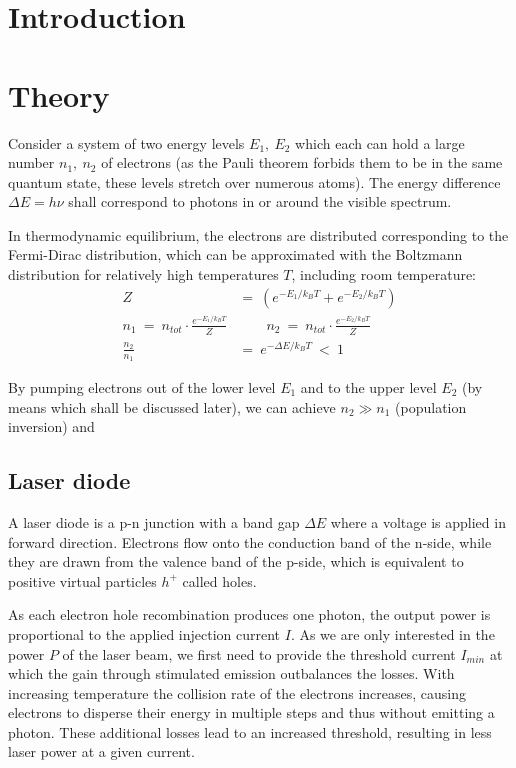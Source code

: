 
\section{Introduction}

\section{Theory}
Consider a system of two energy levels $E_1,~E_2$ which each can hold a large number $n_1,~n_2$ of electrons (as the Pauli theorem forbids them to be in the same quantum state, these levels stretch over numerous atoms). The energy difference $\Delta E = h \nu$ shall correspond to photons in or around the visible spectrum.

In thermodynamic equilibrium, the electrons are distributed corresponding to the Fermi-Dirac distribution, which can be approximated with the Boltzmann distribution for relatively high temperatures $T$, including room temperature:
\begin{align}
Z   ~&=~ \left( e^{-E_1/k_B T} + e^{-E_2/k_B T} \right) \\
n_1 ~=~ n_{tot} \cdot \frac{e^{-E_1/k_B T}}{Z} &\qquad
n_2 ~=~ n_{tot} \cdot \frac{e^{-E_2/k_B T}}{Z} \\
\frac{n_2}{n_1} ~&=~ e^{- \Delta E/k_B T} ~<~ 1
\end{align}

By pumping electrons out of the lower level $E_1$ and to the upper level $E_2$ (by means which shall be discussed later), we can achieve $n_2 \gg n_1$ (population inversion) and



\subsection{Laser diode}
A laser diode is a p-n junction with a band gap $\Delta E$ where a voltage is applied in forward direction. Electrons flow onto the conduction band of the n-side, while they are drawn from the valence band of the p-side, which is equivalent to positive virtual particles $h^+$ called holes.

As each electron hole recombination produces one photon, the output power is proportional to the applied injection current $I$. As we are only interested in the power $P$ of the laser beam, we first need to provide the threshold current $I_{min}$ at which the gain through stimulated emission outbalances the losses. With increasing temperature the collision rate of the electrons increases, causing electrons to disperse their energy in multiple steps and thus without emitting a photon. These additional losses lead to an increased threshold, resulting in less laser power at a given current.


